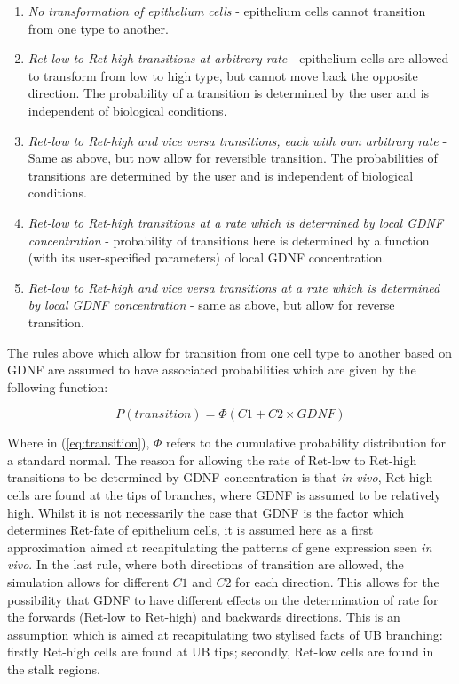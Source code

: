 \documentclass[pdftex,10pt,a4paper]{article}
\begin{document}
\begin{enumerate}
\item \textit{No transformation of epithelium cells} - epithelium cells cannot transition from one type to another.
\item \textit{Ret-low to Ret-high transitions at arbitrary rate} - epithelium cells are allowed to transform from low to high type, but cannot move back the opposite direction. The probability of a transition is determined by the user and is independent of biological conditions.
\item \textit{Ret-low to Ret-high and vice versa transitions, each with own arbitrary rate} - Same as above, but now allow for reversible transition. The probabilities of transitions are determined by the user and is independent of biological conditions.
\item \textit{Ret-low to Ret-high transitions at a rate which is determined by local GDNF concentration} - probability of transitions here is determined by a function (with its user-specified parameters) of local GDNF concentration.
\item \textit{Ret-low to Ret-high and vice versa transitions at a rate which is determined by local GDNF concentration} - same as above, but allow for reverse transition.
\end{enumerate}

The rules above which allow for transition from one cell type to another based on GDNF are assumed to have associated probabilities which are given by the following function:

\begin{equation}\label{eq:transition}
P(transition)= \Phi (C1 + C2\times GDNF)
\end{equation}

Where in (\ref{eq:transition}), $\Phi$ refers to the cumulative probability distribution for a standard normal. The reason for allowing the rate of Ret-low to Ret-high transitions to be determined by GDNF concentration is that \textit{in vivo}, Ret-high cells are found at the tips of branches, where GDNF is assumed to be relatively high. Whilst it is not necessarily the case that GDNF is the factor which determines Ret-fate of epithelium cells, it is assumed here as a first approximation aimed at recapitulating the patterns of gene expression seen \textit{in vivo}. In the last rule, where both directions of transition are allowed, the simulation allows for different $C1$ and $C2$ for each direction. This allows for the possibility that GDNF to have different effects on the determination of rate for the forwards (Ret-low to Ret-high) and backwards directions. This is an assumption which is aimed at recapitulating two stylised facts of UB branching: firstly Ret-high cells are found at UB tips; secondly, Ret-low cells are found in the stalk regions. 
\end{document}
